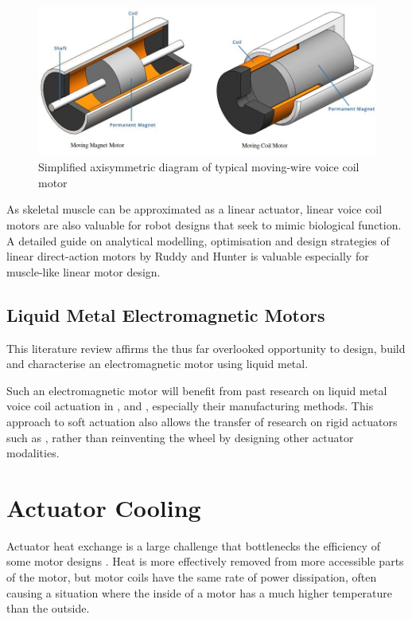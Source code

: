 \documentclass[a4paper,12pt]{article}
\begin{document}
\begin{figure}[h!]
    \centering
    \includegraphics[width=\textwidth]{motorDiagram.jpg}
    \caption{Simplified axisymmetric diagram of typical moving-wire voice coil motor}
    \label{fg:coilmotor}
\end{figure}

As skeletal muscle can be approximated as a linear actuator, linear voice coil motors are also valuable for robot designs that seek to mimic biological function. A detailed guide on analytical modelling, optimisation and design strategies of linear direct-action motors by Ruddy and Hunter \cite{ruddyDesignOptimizationStrategies2011} is valuable especially for muscle-like linear motor design.

\subsection{Liquid Metal Electromagnetic Motors}
This literature review affirms the thus far overlooked opportunity to design, build and characterise an electromagnetic motor using liquid metal.

Such an electromagnetic motor will benefit from past research on liquid metal voice coil actuation in \cite{jinStretchableLoudspeakerUsing2015}, \cite{guoLiquidMetalSpiral2018} and \cite{doMiniatureSoftElectromagnetic2018}, especially their manufacturing methods. This approach to soft actuation also allows the transfer of research on rigid actuators such as \cite{ruddyDesignOptimizationStrategies2011}, rather than reinventing the wheel by designing other actuator modalities.

\section{Actuator Cooling}
Actuator heat exchange is a large challenge that bottlenecks the efficiency of some motor designs \cite{yoonEfficiencyIncreaseInduction2002}. Heat is more effectively removed from more accessible parts of the motor, but motor coils have the same rate of power dissipation, often causing a situation where the inside of a motor has a much higher temperature than the outside.
\end{document}
